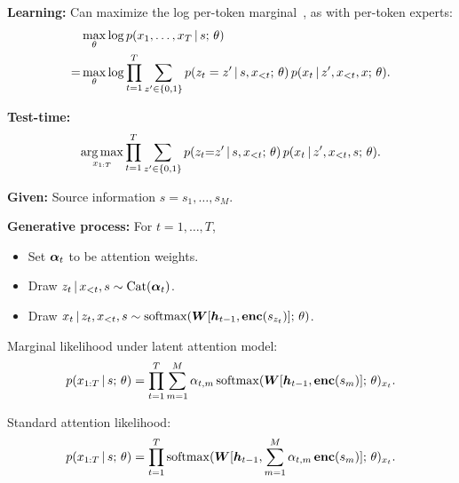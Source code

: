\begin{frame}
\textbf{Learning:} Can maximize the log per-token marginal~\citep{gu2016incorporating}, as with per-token experts:
        \begin{align*}
        &\max_{\theta} \log p(x_1, \ldots, x_T \,|\, s ; \, \theta) \\
        = &\max_{\theta} \log \prod_{t=1}^T \sum_{z' \in\{0, 1\}} p(z_t = z' \,|\, s, x_{<t} ; \, \theta) \, p(x_t \,|\, z', x_{<t}, x ; \, \theta).
    \end{align*}
    
    \air
    \air
\textbf{Test-time:}
\begin{align*}
\argmax_{x_{1:T}} \prod_{t=1}^T \sum_{z' \in\{0, 1\}} p(z_t {=} z' \given s, x_{<t} \param \theta) \, p(x_t \given z', x_{<t}, s \param \theta).
\end{align*}
\end{frame}

\begin{frame}
\textbf{Given:} Source information $s = s_1, \ldots, s_M$.
\air

\textbf{Generative process:} For $t=1, \ldots, T$,
\begin{itemize}
    \item Set $\boldsymbol{\alpha}_t$ to be attention weights.
    \item Draw $z_{t} \,|\, x_{ < t}, s \sim \mathrm{Cat}(\boldsymbol{\alpha}_t)$.
    \item Draw $x_{t} \,|\, z_{t}, x_{< t}, s \sim \operatorname*{softmax}(\boldsymbol{W} [\boldsymbol{h}_{t-1}, \boldsymbol{\mathrm{enc}}(s_{z_{t}})] ; \, \theta)$.
\end{itemize}

\end{frame}

\begin{frame}
Marginal likelihood under latent attention model:
    \begin{align*}
       p(x_{1:T} \,|\, s ; \, \theta) = \prod_{t=1}^T \sum_{m=1}^M \alpha_{t,m} \operatorname*{softmax}(\boldsymbol{W} [\boldsymbol{h}_{t-1}, \boldsymbol{\mathrm{enc}}(s_{m})] ; \, \theta)_{x_t}.
    \end{align*}
    
\air
\air
\air
\air

Standard attention likelihood:
    \begin{align*}
        p(x_{1:T} \,|\, s ; \, \theta) = \prod_{t=1}^T  \operatorname*{softmax}(\boldsymbol{W} [\boldsymbol{h}_{t-1}, \sum_{m=1}^M \alpha_{t,m} \, \boldsymbol{\mathrm{enc}}(s_{m})] ; \, \theta)_{x_t}.
    \end{align*}
    
\end{frame}

